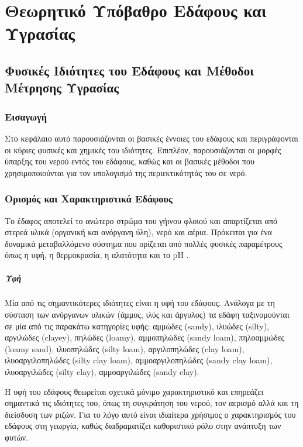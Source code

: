 \chapter{Θεωρητικό Υπόβαθρο Εδάφους και Υγρασίας}
\label{ch:theory}

\section{Φυσικές Ιδιότητες του Εδάφους και Μέθοδοι Μέτρησης Υγρασίας}

\subsection{Εισαγωγή}

Στο κεφάλαιο αυτό παρουσιάζονται οι βασικές έννοιες του εδάφους και
περιγράφονται οι κύριες φυσικές και χημικές του ιδιότητες. Επιπλέον,
παρουσιάζονται οι μορφές ύπαρξης του νερού εντός του εδάφους, καθώς και
οι βασικές μέθοδοι που χρησιμοποιούνται για τον υπολογισμό της
περιεκτικότητάς του σε νερό.

\subsection{Ορισμός και Χαρακτηριστικά Εδάφους}

Το έδαφος αποτελεί το ανώτερο στρώμα του γήινου φλοιού και απαρτίζεται
από στερεά υλικά (οργανική και ανόργανη ύλη), νερό και αέρια. Πρόκειται
για ένα δυναμικά μεταβαλλόμενο σύστημα που ορίζεται από πολλές φυσικές
παραμέτρους όπως η υφή, η θερμοκρασία, η αλατότητα και το pH \cite{ref01}.

\paragraph{Υφή}

Μία από τις σημαντικότερες ιδιότητες είναι η υφή του εδάφους. Ανάλογα με
τη σύσταση των ανόργανων υλικών (άμμος, ιλύς και άργυλος) τα εδάφη
ταξινομούνται σε μία από τις παρακάτω κατηγορίες υφής: αμμώδες (sandy),
ιλυώδες (silty), αργιλώδες (clayey), πηλώδες (loamy), αμμοπηλώδες (sandy
loam), πηλοαμμώδες (loamy sand), ιλυοπηλώδες (silty loam), αργιλοπηλώδες
(clay loam), ιλυοαργιλοπηλώδες (silty clay loam), αμμοαργιλοπηλώδες
(sandy clay loam), ιλυοαργιλώδες (silty clay), αμμοαργιλώδες (sandy
clay). \cite{ref02}

Η υφή του εδάφους θεωρείται σχετικά μόνιμο χαρακτηριστικό και επηρεάζει
σημαντικά τις ιδιότητες του, όπως τη συγκράτηση του νερού, τον αερισμό
αλλά και τη διείσδυση των ριζών. Για το λόγο αυτό είναι ιδιαίτερα
χρήσιμος ο χαρακτηρισμός του εδάφους στη γεωργία, καθώς διαδραματίζει
καθοριστικό ρόλο στην ανάπτυξη των φυτών.

